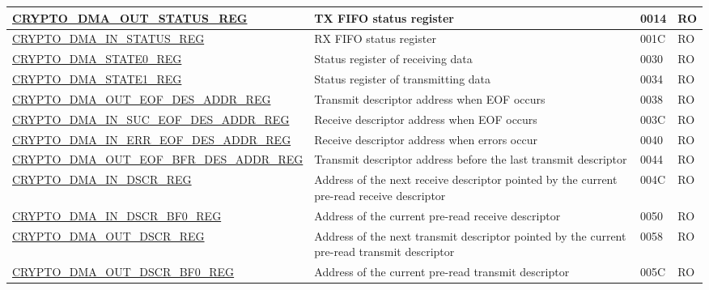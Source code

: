 \begin{longtable}{ | p{6cm} | p{7.2cm} | p{1.3cm} | p{1cm} | }
\hyperref[regdesc:CRYPTODMAOUTSTATUSREG]{CRYPTO\_DMA\_OUT\_STATUS\_REG} & TX FIFO status register & \hexprefix{}0014 & RO \\ \hline
\hyperref[regdesc:CRYPTODMAINSTATUSREG]{CRYPTO\_DMA\_IN\_STATUS\_REG} & RX FIFO status register & \hexprefix{}001C & RO \\ \hline
\hyperref[regdesc:CRYPTODMASTATE0REG]{CRYPTO\_DMA\_STATE0\_REG} & Status register of receiving data & \hexprefix{}0030 & RO \\ \hline
\hyperref[regdesc:CRYPTODMASTATE1REG]{CRYPTO\_DMA\_STATE1\_REG} & Status register of transmitting data & \hexprefix{}0034 & RO \\ \hline
\hyperref[regdesc:CRYPTODMAOUTEOFDESADDRREG]{CRYPTO\_DMA\_OUT\_EOF\_DES\_ADDR\newline\_REG} & Transmit descriptor address when EOF occurs & \hexprefix{}0038 & RO \\ \hline
\hyperref[regdesc:CRYPTODMAINSUCEOFDESADDRREG]{CRYPTO\_DMA\_IN\_SUC\_EOF\_DES\newline\_ADDR\_REG} & Receive descriptor address when EOF occurs & \hexprefix{}003C & RO \\ \hline
\hyperref[regdesc:CRYPTODMAINERREOFDESADDRREG]{CRYPTO\_DMA\_IN\_ERR\_EOF\_DES\newline\_ADDR\_REG} & Receive descriptor address when errors occur & \hexprefix{}0040 & RO \\ \hline
\hyperref[regdesc:CRYPTODMAOUTEOFBFRDESADDRREG]{CRYPTO\_DMA\_OUT\_EOF\_BFR\_DES\newline\_ADDR\_REG} & Transmit descriptor address before the last transmit descriptor & \hexprefix{}0044 & RO \\ \hline
\hyperref[regdesc:CRYPTODMAINDSCRREG]{CRYPTO\_DMA\_IN\_DSCR\_REG} & Address of the next receive descriptor pointed by the current pre-read receive descriptor & \hexprefix{}004C & RO \\ \hline
\hyperref[regdesc:CRYPTODMAINDSCRBF0REG]{CRYPTO\_DMA\_IN\_DSCR\_BF0\_REG} & Address of the current pre-read receive descriptor & \hexprefix{}0050 & RO \\ \hline
\hyperref[regdesc:CRYPTODMAOUTDSCRREG]{CRYPTO\_DMA\_OUT\_DSCR\_REG} & Address of the next transmit descriptor pointed by the current pre-read transmit descriptor & \hexprefix{}0058 & RO \\ \hline
\hyperref[regdesc:CRYPTODMAOUTDSCRBF0REG]{CRYPTO\_DMA\_OUT\_DSCR\_BF0\_REG} & Address of the current pre-read transmit descriptor & \hexprefix{}005C & RO \\ \hline
\end{longtable}

